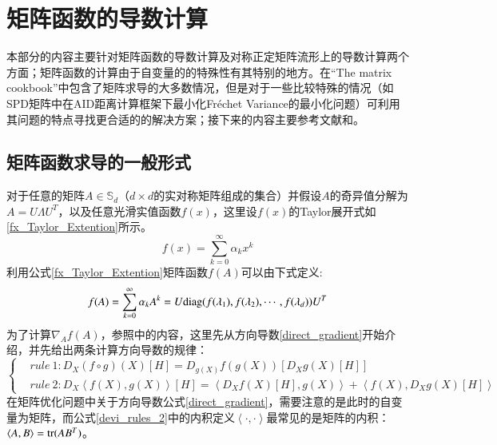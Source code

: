 \section{矩阵函数的导数计算}
本部分的内容主要针对矩阵函数的导数计算及对称正定矩阵流形上的导数计算两个方面；矩阵函数的计算由于自变量的的特殊性有其特别的地方。在“The matrix cookbook”\cite{Matrix_CookBook}中包含了矩阵求导的大多数情况，但是对于一些比较特殊的情况（如SPD矩阵中在AID距离计算框架下最小化Fr\'echet Variance的最小化问题）可利用其问题的特点寻找更合适的的解决方案；接下来的内容主要参考文献\cite{Maniopt_DiscreteCurveFitting}和\cite{Maniopt_book}。
\subsection{矩阵函数求导的一般形式}
\label{sec:matrix_func_devi}
对于任意的矩阵$A \in \mathbb{S}_{d}$（$d\times d$的实对称矩阵组成的集合）并假设$A$的奇异值分解为$A=U\Lambda U^{T}$，以及任意光滑实值函数$f(x)$，这里设$f(x)$的Taylor展开式如\ref{fx_Taylor_Extention}所示。
\begin{equation}
\label{fx_Taylor_Extention}
f(x)=\sum_{k=0}^{\infty}\alpha_{k}x^{k}
\end{equation}
利用公式\ref{fx_Taylor_Extention}矩阵函数$f(A)$可以由下式定义:
\begin{equation}
\label{Matrix_Function}
f(A)=\sum_{k=0}^{\infty}\alpha_{k}A^{k}=U{\rm diag}(f(\lambda_1),f(\lambda_2),\cdots,f(\lambda_{d}))U^{T}
\end{equation}
为了计算$\nabla_{A}f(A)$，参照\cite{Maniopt_DiscreteCurveFitting}中的内容，这里先从方向导数\ref{direct_gradient}开始介绍，并先给出两条计算方向导数的规律\cite{Maniopt_DiscreteCurveFitting}：
\begin{equation}
\label{devi_rules_2}
\left\{
\begin{split}
&rule~1:D_{X}(f\circ g)(X)[H]=D_{g(X)}f(g(X))[D_{X}g(X)[H]]\\
&rule~2:D_{X}\left<f(X),g(X)\right>[H]=\left<D_{X}f(X)[H],g(X)\right>+\left<f(X),D_{X}g(X)[H]\right>
\end{split}
\right.
\end{equation}
在矩阵优化问题中关于方向导数公式\ref{direct_gradient}，需要注意的是此时的自变量为矩阵，而公式\ref{devi_rules_2}中的内积定义$\left<\cdot,\cdot\right>$最常见的是矩阵的内积：$\left<A,B\right>={\rm tr}(AB^{T})$。


